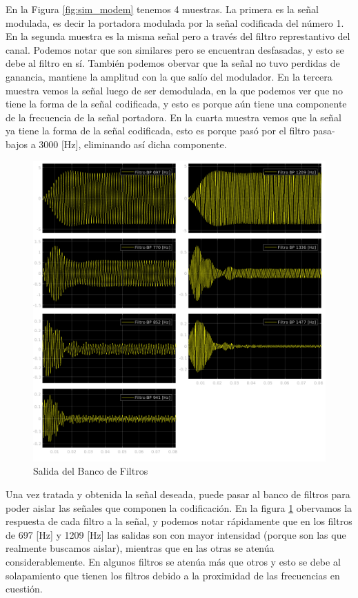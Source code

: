 En la Figura \ref{fig:sim_modem} tenemos 4 muestras. La primera es la señal modulada, es decir la portadora modulada por la señal codificada del número 1. En la segunda muestra es la misma señal pero a través del filtro represtantivo del canal. Podemos notar que son similares pero se encuentran desfasadas, y esto se debe al filtro en sí. También podemos obervar que la señal no tuvo perdidas de ganancia, mantiene la amplitud con la que salío del modulador. En la tercera muestra vemos la señal luego de ser demodulada, en la que podemos ver que no tiene la forma de la señal codificada, y esto es porque aún tiene una componente de la frecuencia de la señal portadora. En la cuarta muestra vemos que la señal ya tiene la forma de la señal codificada, esto es porque pasó por el filtro pasa-bajos a 3000 [Hz], eliminando así dicha componente.

\begin{figure}[!htb]
  \centering
  \includegraphics[width=\linewidth]{images/simulacion/extendido/bank.png}
  \caption{Salida del Banco de Filtros}
  \label{fig:sim_bank}
\end{figure}

Una vez tratada y obtenida la señal deseada, puede pasar al banco de filtros para poder aislar las señales que componen la codificación. En la figura \ref{fig:sim_bank} obervamos la respuesta de cada filtro a la señal, y podemos notar rápidamente que en los filtros de 697 [Hz] y 1209 [Hz] las salidas son con mayor intensidad (porque son las que realmente buscamos aislar), mientras que en las otras se atenúa considerablemente. En algunos filtros se atenúa más que otros y esto se debe al solapamiento que tienen los filtros debido a la proximidad de las frecuencias en cuestión.

